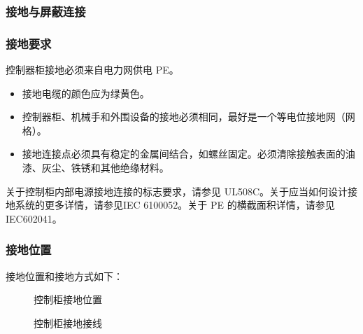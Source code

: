 \documentclass[a4paper,11pt,english,openany,oneside]{sphinxmanual}
\begin{document}
\subsubsection{接地与屏蔽连接}
\label{\detokenize{08 _u5b89_u88c5_u4e0e_u8c03_u8bd5:id50}}\label{\detokenize{08 _u5b89_u88c5_u4e0e_u8c03_u8bd5:id51}}

\subsubsection{接地要求}
\label{\detokenize{08 _u5b89_u88c5_u4e0e_u8c03_u8bd5:id52}}\label{\detokenize{08 _u5b89_u88c5_u4e0e_u8c03_u8bd5:id53}}
\sphinxAtStartPar
控制器柜接地必须来自电力网供电 PE。
\begin{itemize}
\item {} 
\sphinxAtStartPar
接地电缆的颜色应为绿黄色。

\item {} 
\sphinxAtStartPar
控制器柜、机械手和外围设备的接地必须相同，最好是一个等电位接地网（网格）。

\item {} 
\sphinxAtStartPar
接地连接点必须具有稳定的金属间结合，如螺丝固定。必须清除接触表面的油漆、灰尘、铁锈和其他绝缘材料。

\end{itemize}

\sphinxAtStartPar
关于控制柜内部电源接地连接的标志要求，请参见 UL508C。关于应当如何设计接地系统的更多详情，请参见IEC 61000\sphinxhyphen{}5\sphinxhyphen{}2。关于 PE 的横截面积详情，请参见 IEC60204\sphinxhyphen{}1。


\subsubsection{接地位置}
\label{\detokenize{08 _u5b89_u88c5_u4e0e_u8c03_u8bd5:id54}}\label{\detokenize{08 _u5b89_u88c5_u4e0e_u8c03_u8bd5:id55}}
\sphinxAtStartPar
接地位置和接地方式如下：

\begin{figure}[H]
\centering
\capstart

\noindent{}
\caption{控制柜接地位置}\label{\detokenize{08 _u5b89_u88c5_u4e0e_u8c03_u8bd5:id106}}\end{figure}



\begin{figure}[H]
\centering
\capstart

\noindent{}
\caption{控制柜接地接线}\label{\detokenize{08 _u5b89_u88c5_u4e0e_u8c03_u8bd5:id107}}\end{figure}
\end{document}
